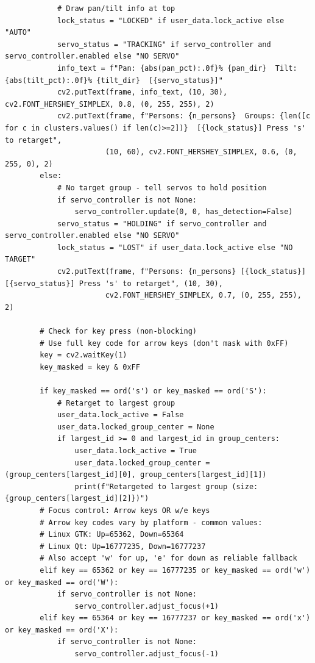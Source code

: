 \documentclass[11pt,a4paper]{article}
\begin{document}
\begin{lstlisting}
            # Draw pan/tilt info at top
            lock_status = "LOCKED" if user_data.lock_active else "AUTO"
            servo_status = "TRACKING" if servo_controller and servo_controller.enabled else "NO SERVO"
            info_text = f"Pan: {abs(pan_pct):.0f}% {pan_dir}  Tilt: {abs(tilt_pct):.0f}% {tilt_dir}  [{servo_status}]"
            cv2.putText(frame, info_text, (10, 30), cv2.FONT_HERSHEY_SIMPLEX, 0.8, (0, 255, 255), 2)
            cv2.putText(frame, f"Persons: {n_persons}  Groups: {len([c for c in clusters.values() if len(c)>=2])}  [{lock_status}] Press 's' to retarget", 
                       (10, 60), cv2.FONT_HERSHEY_SIMPLEX, 0.6, (0, 255, 0), 2)
        else:
            # No target group - tell servos to hold position
            if servo_controller is not None:
                servo_controller.update(0, 0, has_detection=False)
            servo_status = "HOLDING" if servo_controller and servo_controller.enabled else "NO SERVO"
            lock_status = "LOST" if user_data.lock_active else "NO TARGET"
            cv2.putText(frame, f"Persons: {n_persons} [{lock_status}] [{servo_status}] Press 's' to retarget", (10, 30), 
                       cv2.FONT_HERSHEY_SIMPLEX, 0.7, (0, 255, 255), 2)
        
        # Check for key press (non-blocking)
        # Use full key code for arrow keys (don't mask with 0xFF)
        key = cv2.waitKey(1)
        key_masked = key & 0xFF
        
        if key_masked == ord('s') or key_masked == ord('S'):
            # Retarget to largest group
            user_data.lock_active = False
            user_data.locked_group_center = None
            if largest_id >= 0 and largest_id in group_centers:
                user_data.lock_active = True
                user_data.locked_group_center = (group_centers[largest_id][0], group_centers[largest_id][1])
                print(f"Retargeted to largest group (size: {group_centers[largest_id][2]})")
        # Focus control: Arrow keys OR w/e keys
        # Arrow key codes vary by platform - common values:
        # Linux GTK: Up=65362, Down=65364
        # Linux Qt: Up=16777235, Down=16777237
        # Also accept 'w' for up, 'e' for down as reliable fallback
        elif key == 65362 or key == 16777235 or key_masked == ord('w') or key_masked == ord('W'):
            if servo_controller is not None:
                servo_controller.adjust_focus(+1)
        elif key == 65364 or key == 16777237 or key_masked == ord('x') or key_masked == ord('X'):
            if servo_controller is not None:
                servo_controller.adjust_focus(-1)
        

\end{lstlisting}
\end{document}
